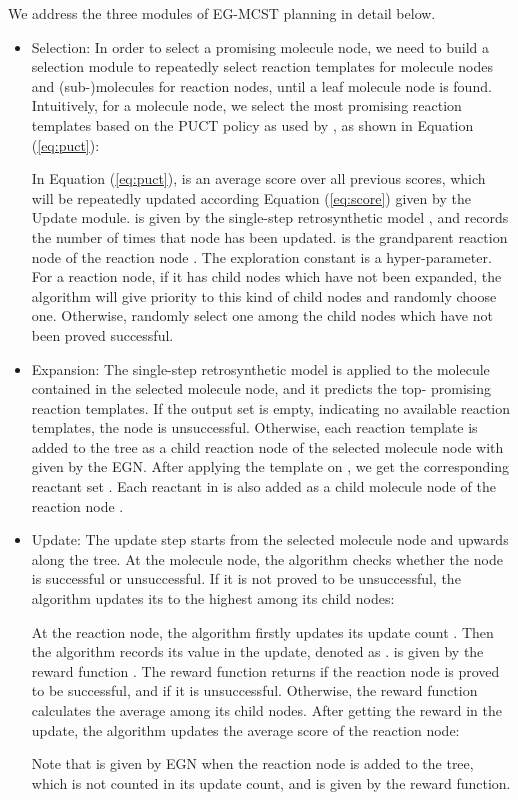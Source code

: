 \documentclass[sn-mathphys,Numbered]{sn-jnl}
\begin{document}
We address the three modules of EG-MCST planning in detail below. 
\begin{itemize}
    \item Selection: In order to select a promising molecule node, we need to build a selection module to repeatedly select reaction templates for molecule nodes and (sub-)molecules for reaction nodes, until a leaf molecule node is found. Intuitively, for a molecule node, we select the most promising reaction templates based on the PUCT policy as used by \cite{puct2010}, as shown in Equation (\ref{eq:puct}):
        
    In Equation (\ref{eq:puct}),  is an average score over all previous scores, which will be repeatedly updated according Equation (\ref{eq:score}) given by the Update module.  is given by the single-step retrosynthetic model , and  records the number of times that node  has been updated.  is the grandparent reaction node of the reaction node . The exploration constant  is a  hyper-parameter. For a reaction node, if it has child nodes which have not been expanded, the algorithm will give priority to this kind of child nodes and randomly choose one. Otherwise, randomly select one among the child nodes which have not been proved successful.
    \item Expansion: The single-step retrosynthetic model  is applied to the molecule  contained in the selected molecule node, and it predicts the top- promising reaction templates. If the output set is empty, indicating no available reaction templates, the node is unsuccessful. Otherwise, each reaction template  is added to the tree as a child reaction node of the selected molecule node with  given by the EGN. After applying the template  on , we get the corresponding reactant set . Each reactant  in  is also added as a child molecule node of the reaction node . 
    \item Update: The update step starts from the selected molecule node and upwards along the tree. At the molecule node, the algorithm checks whether the node is successful or unsuccessful. If it is not proved to be unsuccessful, the algorithm updates its  to the highest  among its child nodes: 
        
    At the reaction node, the algorithm firstly updates its update count . Then the algorithm records its  value in the  update, denoted as .  is given by the reward function .
    The reward function returns  if the reaction node is proved to be successful, and  if it is unsuccessful. Otherwise, the reward function calculates the average  among its child nodes. After getting the reward in the  update, the algorithm updates the average score  of the reaction node: 
         
    Note that  is given by EGN when the reaction node  is added to the tree, which is not counted in its update count, and  is given by the reward function. 
\end{itemize}
\end{document}
